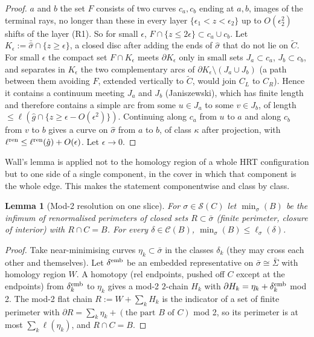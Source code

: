 \documentclass[aps,prd,onecolumn,superscriptaddress,nofootinbib,amsmath,amssymb,11pt]{revtex4-2}
\newtheorem{lemma}[theorem]{Lemma}
\theoremstyle{definition}
\newcommand{\Cut}{\mathcal{C}}
\newcommand{\eps}{\epsilon}
\begin{document}
\begin{proof}
$a$ and $b$ the set $F$ consists of two curves $c_a,c_b$ ending at $a,b$, images of the terminal rays, no longer than these in every
layer $\{\eps_1<z<\eps_2\}$ up to $O(\eps_2^2)$ shifts of the layer (R1). So for small $\eps$, $F\cap\{z\le2\eps\}\subset c_a\cup c_b$. Let $K_\eps:=\bar{\hat\sigma}\cap\{z\ge\eps\}$, a
closed disc after adding the ends of $\hat\sigma$ that do not lie on $\tilde C$. For small $\eps$ the compact set $F\cap K_\eps$ meets
$\partial K_\eps$ only in small sets $J_a\subset c_a$, $J_b\subset c_b$, and separates in $K_\eps$ the two complementary arcs of
$\partial K_\eps\setminus(J_a\cup J_b)$ (a path between them avoiding $F$, extended vertically to $\tilde C$, would join $C_L$ to $C_R$).
Hence it contains a continuum meeting $J_a$ and $J_b$ (Janiszewski), which has finite length and therefore contains a simple arc
from some $u\in J_a$ to some $v\in J_b$, of length $\le\ell(\hat g\cap\{z\ge\eps-O(\eps^2)\})$. Continuing along $c_a$ from $u$ to $a$
and along $c_b$ from $v$ to $b$ gives a curve on $\hat\sigma$ from $a$ to $b$, of class $\kappa$ after projection, with
$\ell^{\rm ren}\le\ell^{\rm ren}(\hat g)+O(\eps)$. Let $\eps\to0$.
\end{proof}

Wall's lemma is applied not to the homology region of a whole HRT configuration but to one side of a single component,
in the cover in which that component is the whole edge. This makes the statement componentwise and class by class.

\begin{lemma}[Mod-2 resolution on one slice]\label{lem:Q}
For $\sigma\in\mathcal S(C)$ let $\min_\sigma(B)$ be the infimum of renormalised perimeters of closed sets $R\subset\bar\sigma$ (finite
perimeter, closure of interior) with $R\cap C=B$. For every $\delta\in\Cut(B)$, $\min_\sigma(B)\le\ell_\sigma(\delta)$.
\end{lemma}

\begin{proof}
Take near-minimising curves $\eta_k\subset\bar\sigma$ in the classes $\delta_k$ (they may cross each other and themselves). Let
$\delta^{\rm emb}$ be an embedded representative on $\bar\sigma\cong\bar\Sigma$ with homology region $W$. A homotopy (rel endpoints,
pushed off $C$ except at the endpoints) from $\delta^{\rm emb}_k$ to $\eta_k$ gives a mod-2 $2$-chain $H_k$ with
$\partial H_k=\eta_k+\delta^{\rm emb}_k$ mod 2. The mod-2 flat chain $R:=W+\sum_kH_k$ is the indicator of a set of finite
perimeter with $\partial R=\sum_k\eta_k+(\text{the part }B\text{ of }C)$ mod 2, so its perimeter is at most $\sum_k\ell(\eta_k)$, and
$R\cap C=B$.
\end{proof}
\end{document}
